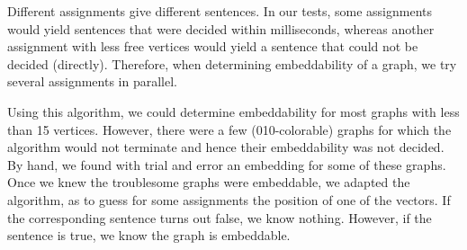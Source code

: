 \documentclass{report}
\begin{document}
Different assignments give different sentences.  In our tests,
some assignments would yield sentences that were decided within milliseconds,
whereas another assignment with less free vertices would
yield a sentence that could not be decided (directly).
Therefore, when determining embeddability of a graph,
we try several assignments in parallel.

Using this algorithm, we could determine embeddability for most graphs
with less than 15 vertices.  However, there were  a few (010-colorable)
graphs for which the algorithm would not terminate and hence
their embeddability was not decided.
By hand, we found with trial and error an embedding for
some of these graphs.
Once we knew the troublesome graphs were embeddable,
we adapted the algorithm, as to guess
for some assignments the position of one of the vectors.
If the corresponding
sentence turns out false, we know nothing.  However,
if the sentence is true, we know the graph is embeddable.
\end{document}
